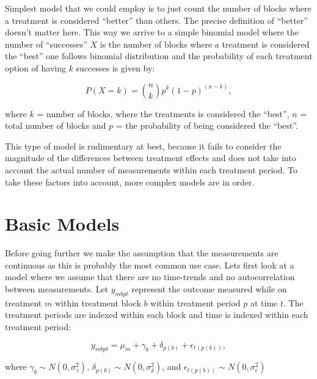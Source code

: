 \documentclass[12pt,a4paper,leqno]{report}
\theoremstyle{plain}
\theoremstyle{definition}
\theoremstyle{remark}
\begin{document}
Simplest model that we could employ is to just count the number of
blocks where a treatment is considered ``better'' than others. The precise
definition of ``better'' doesn't matter here. This way we arrive to a simple binomial
model where the number of ``successes'' \(X\) is the number of blocks where a treatment
is considered the ``best'' one follows binomial distribution and the probability of
each treatment option of having \(k\) successes is given by:

\begin{def}\label{}
    \begin{equation}
        P(X = k) = {n\choose k}p^k{(1-p)}^{(n-k)},
    \end{equation}
\end{def}where \(k\) = number of blocks, where the treatments is considered the ``best'',
\(n\) = total number of blocks and \(p\) = the probability of being considered the ``best''.

This type of model is rudimentary at best, because it fails to consider the magnitude of the
differences between treatment effects and does not take into account the actual number of
measurements within each treatment period. To take these factors into account,
more complex models are in order.

\section{Basic Models}\label{conti}

Before going further we make the assumption that the measurements are continuous as
this is probably the most common use case. Lets first look at a model where we assume
that there are no time-trends and no autocorrelation between measurements.
Let \(y_{mbpt}\) represent the outcome measured while on treatment \(m\) within
treatment block \(b\) within treatment period \(p\) at time \(t\). The treatment
periods are indexed within each block and time is indexed within each treatment
period:

\begin{def}\label{}
    \begin{equation}\label{allerrors}
        y_{mbpt} = \mu_m + \gamma_b + \delta_{p(b)} + \epsilon_{t(p(b))},
    \end{equation}
\end{def}where \(\gamma_b \sim N(0,\sigma^2_{\gamma})\),
\(\delta_{p(b)} \sim N(0,\sigma^2_{\delta})\), and
\(\epsilon_{t(p(b))} \sim N(0,\sigma^2_{\epsilon})\)
\end{document}
